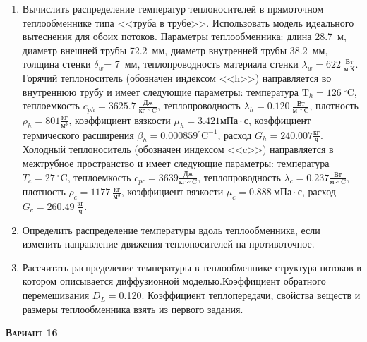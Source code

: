 \begin{enumerate} 
\item Вычислить распределение температур теплоносителей в прямоточном теплообменнике типа <<труба в трубе>>. Использовать модель идеального вытеснения для обоих потоков. Параметры теплообменника: длина  28.7~м, диаметр внешней трубы 72.2~мм,  диаметр внутренней трубы 38.2~мм, толщина стенки $\delta_{w}$=     7~мм,  теплопроводность материала стенки $\lambda_{w}=  622~\frac{\text{Вт}}{\text{м} \cdot \text{К}}$.  Горячий теплоноситель (обозначен индексом <<h>>) направляется во внутреннюю трубу и	 имеет следующие параметры: температура $\text{T}_{h}= 126~^\circ\mathrm{C}$, теплоемкость	  $c_{p{h}}= 3625.7~\frac{\text{Дж}}{\text{кг} \cdot ^\circ\mathrm{C}}$, теплопроводность 		$\lambda_{h}= 0.120~\frac{\text{Вт}}{\text{м} \cdot ^\circ\mathrm{C}}$, плотность 		$\rho_{h}=  801 \frac{\text{кг}}{\text{м}^3}$, коэффициент вязкости $\mu_{h}=3.421 \text{мПа} 		\cdot \text{с} $, коэффициент термического расширения $\beta_{h}=0.000859 ^\circ\mathrm{C}^{-1}$,		 расход $G_{h}= 240.007 \frac{\text{кг}}{\text{ч}}$. Холодный теплоноситель (обозначен индексом <<c>>) 		 направляется в межтрубное пространство и имеет следующие параметры: температура $T_{c}=   27		 ~^\circ\mathrm{C}$, теплоемкость $c_{p{c}}= 3639 \frac{\text{Дж}}{\text{кг} \cdot ^\circ\mathrm{C}}$,			 теплопроводность $\lambda_{c}=0.237 \frac{\text{Вт}}{\text{м} \cdot ^\circ\mathrm{C}}$, плотность 			 $\rho_{c}=  1177~\frac{\text{кг}}{\text{м}^3}$, коэффициент вязкости $\mu_{c}=0.888~\text{мПа} \cdot \text{с} $, 			 расход $G_{c}=260.49~\frac{\text{кг}}{\text{ч}}$. 

\item Определить распределение температуры вдоль теплообменника, если 	изменить направление движения теплоносителей на противоточное.

\item Рассчитать распределение температуры в теплообменнике структура потоков в котором описывается диффузионной моделью.Коэффициент обратного перемешивания $D_L = $0.120. Коэффициент теплопередачи, свойства веществ и размеры теплообменника взять из первого задания. 

\end{enumerate}

\textsc{\textbf{Вариант 16}}


